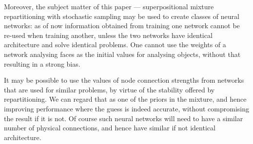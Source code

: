 \documentclass[usenatbib]{mnras}
\begin{document}
Moreover, the subject matter of this paper --- superpositional
mixture repartitioning with stochastic sampling may be used to
create classes of neural networks: as of now information obtained
from training one network cannot be re-used when training another,
unless the two networks have identical architecture and solve
identical problems. One cannot use the weights of a network
analysing faces as the initial values for analysing objects,
without that resulting in a strong bias.

It may be possible to use the values of node connection strengths
from networks that are used for similar problems, by virtue of the
stability offered by repartitioning. We can regard that as one of
the priors in the mixture, and hence improving performance where
the guess is indeed accurate, without compromising the result if it
is not. Of course such neural networks will need to have a similar
number of physical connections, and hence have similar if not
identical architecture.



\end{document}
